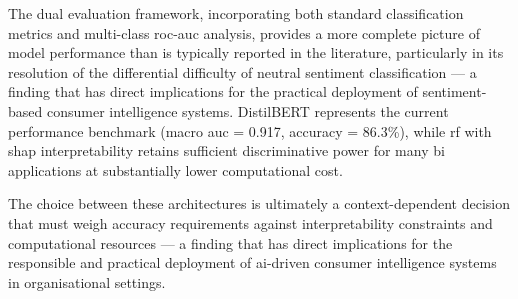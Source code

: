 The dual evaluation framework, incorporating both standard classification metrics and multi-class \gls{roc}-\gls{auc} analysis, provides a more complete picture of model performance than is typically reported in the literature, particularly in its resolution of the differential difficulty of neutral sentiment classification --- a finding that has direct implications for the practical deployment of sentiment-based consumer intelligence systems. DistilBERT represents the current performance benchmark (macro \gls{auc} = 0.917, accuracy = 86.3\%), while \gls{rf} with \gls{shap} interpretability retains sufficient discriminative power for many \gls{bi} applications at substantially lower computational cost.

The choice between these architectures is ultimately a context-dependent decision that must weigh accuracy requirements against interpretability constraints and computational resources --- a finding that has direct implications for the responsible and practical deployment of \gls{ai}-driven consumer intelligence systems in organisational settings.
